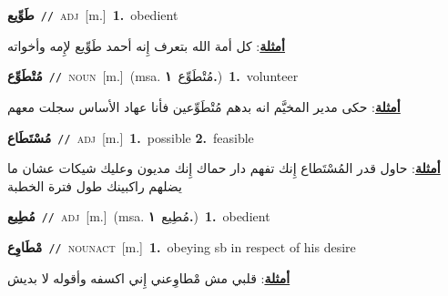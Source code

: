 \documentclass[10pt,a4paper,twoside]{article} %
\begin{document}
\begin{multicols}{2}
{\setlength\topsep{0pt}\textbf{\foreignlanguage{arabic}{طَوِّيع}}\ {\color{gray}\texttt{//}\color{black}}\ \textsc{adj}\ [m.]\ \textbf{1.}~obedient\  \begin{flushright}\color{gray}\foreignlanguage{arabic}{\textbf{\underline{\foreignlanguage{arabic}{أمثلة}}}: كل أمة الله بتعرف إِنه أحمد طَوِّيع لإِمه وأخواته}\end{flushright}\color{black}} \vspace{2mm}

{\setlength\topsep{0pt}\textbf{\foreignlanguage{arabic}{مُتْطَوِّع}}\ {\color{gray}\texttt{//}\color{black}}\ \textsc{noun}\ [m.]\ \color{gray}(msa. \foreignlanguage{arabic}{مُتْطَوِّع}~\foreignlanguage{arabic}{\textbf{١.}})\color{black}\ \textbf{1.}~volunteer\  \begin{flushright}\color{gray}\foreignlanguage{arabic}{\textbf{\underline{\foreignlanguage{arabic}{أمثلة}}}: حكى مدير المخيَّم انه بدهم مُتْطَوِّعين فأنا عهاد الأساس سجلت معهم}\end{flushright}\color{black}} \vspace{2mm}

{\setlength\topsep{0pt}\textbf{\foreignlanguage{arabic}{مُسْتَطَاع}}\ {\color{gray}\texttt{//}\color{black}}\ \textsc{adj}\ [m.]\ \textbf{1.}~possible  \textbf{2.}~feasible\  \begin{flushright}\color{gray}\foreignlanguage{arabic}{\textbf{\underline{\foreignlanguage{arabic}{أمثلة}}}: حاول قدر المُسْتَطاع إِنك تفهم دار حماك إِنك مديون وعليك شيكات عشان ما يضلهم راكبينك طول فترة الخطبة}\end{flushright}\color{black}} \vspace{2mm}

{\setlength\topsep{0pt}\textbf{\foreignlanguage{arabic}{مُطِيع}}\ {\color{gray}\texttt{//}\color{black}}\ \textsc{adj}\ [m.]\ \color{gray}(msa. \foreignlanguage{arabic}{مُطِيع}~\foreignlanguage{arabic}{\textbf{١.}})\color{black}\ \textbf{1.}~obedient\ } \vspace{2mm}

{\setlength\topsep{0pt}\textbf{\foreignlanguage{arabic}{مْطَاوِع}}\ {\color{gray}\texttt{//}\color{black}}\ \textsc{noun\textunderscore act}\ [m.]\ \textbf{1.}~obeying sb in respect of his desire\  \begin{flushright}\color{gray}\foreignlanguage{arabic}{\textbf{\underline{\foreignlanguage{arabic}{أمثلة}}}: قلبي مش مْطاوِعني إِني اكسفه وأقوله لا بديش}\end{flushright}\color{black}} \vspace{2mm}


\end{multicols}
\end{document}
